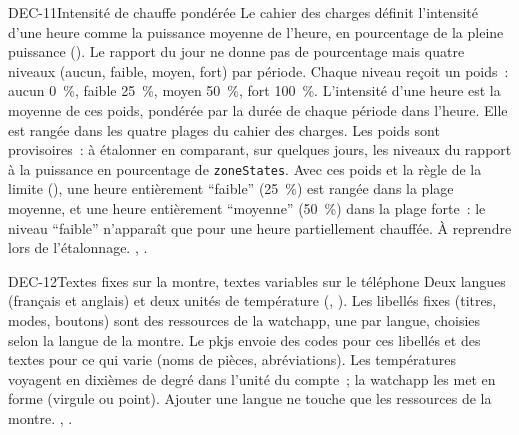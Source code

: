 \begin{decision}{DEC-11}{Intensité de chauffe pondérée}
   Le cahier des charges définit l'intensité d'une heure comme la puissance moyenne
  de l'heure, en pourcentage de la pleine puissance (). Le rapport du jour ne
  donne pas de pourcentage mais quatre niveaux (aucun, faible, moyen, fort) par période.
   Chaque niveau reçoit un poids~: aucun 0~\%, faible 25~\%, moyen 50~\%, fort
  100~\%. L'intensité d'une heure est la moyenne de ces poids, pondérée par la durée de chaque période
  dans l'heure. Elle est rangée dans les quatre plages du cahier des charges.
   Les poids sont provisoires~: à étalonner en comparant, sur quelques jours,
  les niveaux du rapport à la puissance en pourcentage de \texttt{zoneStates}.
  Avec ces poids et la règle de la limite (), une heure entièrement \enquote{faible} (25~\%)
  est rangée dans la plage moyenne, et une heure entièrement \enquote{moyenne} (50~\%) dans la plage forte~: le niveau
  \enquote{faible} n'apparaît que pour une heure partiellement chauffée. À reprendre lors de l'étalonnage.
   , .
\end{decision}

\begin{decision}{DEC-12}{Textes fixes sur la montre, textes variables sur le téléphone}
   Deux langues (français et anglais) et deux unités de température
  (, ).
   Les libellés fixes (titres, modes, boutons) sont des ressources de la
  watchapp, une par langue, choisies selon la langue de la montre. Le pkjs envoie des codes
  pour ces libellés et des textes pour ce qui varie (noms de pièces, abréviations). Les
  températures voyagent en dixièmes de degré dans l'unité du compte~; la watchapp
  les met en forme (virgule ou point).
   Ajouter une langue ne touche que les ressources de la montre.
   , .
\end{decision}

